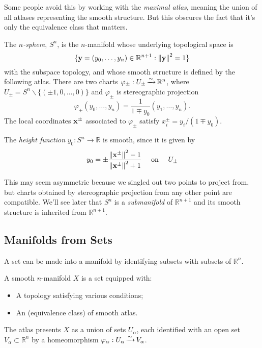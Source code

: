 \documentclass[a4paper,11pt]{article}
\begin{document}
	Some people avoid this by working with the \emph{maximal atlas}, meaning the union of all atlases representing the smooth structure. But this obscures the fact that it's only the equivalence class that matters.

	\begin{ex}
		The \emph{$n$-sphere}, $S^n$, is the $n$-manifold whose underlying topological space is
		\[
			\{\vb{y} = (y_0, \dots, y_n) \in \mathbb{R}^{n+1}: \norm{\vb{y}}^2 = 1\}
		\]
		with the subspace topology, and whose smooth structure is defined by the following atlas. There are two charts $\varphi_{\pm}: U_{\pm} \operatorname{\xrightarrow{\sim}} \mathbb{R}^n$, where $U_\pm = S^n \backslash \{(\pm 1, 0, \dots, 0)\}$ and $\varphi_{\pm}$ is stereographic projection
		\[
			\varphi_{\pm}(y_0, \dots, y_n) = \frac{1}{1 \mp y_0}(y_1, \dots, y_n).
		\]
		The local coordinates $\vb{x}^\pm$ associated to $\varphi_\pm$ satisfy $x^\pm_i = y_i / (1 \mp y_0)$.


		The \emph{height function} $y_0 : S^n \to \mathbb{R}$ is smooth, since it is given by
		\[
			y_0 = \pm \frac{\norm{\vb{x}^\pm}^2 - 1}{\norm{\vb{x}^\pm}^2 + 1}\quad\text{ on }\quad U_\pm
		\]
	\end{ex}

	\begin{rmk}
		This may seem asymmetric because we singled out two points to project from, but charts obtained by stereographic projection from any other point are compatible. We'll see later that $S^n$ is a \emph{submanifold} of $\mathbb{R}^{n+1}$ and its smooth structure is inherited from $\mathbb{R}^{n+1}$. 
	\end{rmk}

	\subsection{Manifolds from Sets} 

	A set can be made into a manifold by identifying subsets with subsets of $\mathbb{R}^n$.

	A smooth $n$-manifold $X$ is a set equipped with:
	\begin{itemize}
		\item A topology satisfying various conditions;
		\item An (equivalence class) of smooth atlas.
	\end{itemize}

	The atlas presents $X$ as a union of sets $U_\alpha$, each identified with an open set $V_\alpha \subset \mathbb{R}^n$ by a homeomorphism $\varphi_\alpha: U_\alpha \operatorname{\xrightarrow{\sim}} V_\alpha$.
\end{document}
